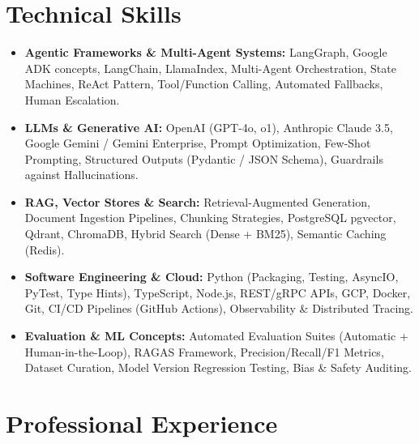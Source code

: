\documentclass[a4paper,10pt]{article}
\begin{document}
\section{Technical Skills}
\begin{itemize}[leftmargin=1.2em, itemsep=2pt]
  \item \textbf{Agentic Frameworks \& Multi-Agent Systems:} LangGraph, Google ADK concepts, LangChain, LlamaIndex, Multi-Agent Orchestration, State Machines, ReAct Pattern, Tool/Function Calling, Automated Fallbacks, Human Escalation.
  \item \textbf{LLMs \& Generative AI:} OpenAI (GPT-4o, o1), Anthropic Claude 3.5, Google Gemini / Gemini Enterprise, Prompt Optimization, Few-Shot Prompting, Structured Outputs (Pydantic / JSON Schema), Guardrails against Hallucinations.
  \item \textbf{RAG, Vector Stores \& Search:} Retrieval-Augmented Generation, Document Ingestion Pipelines, Chunking Strategies, PostgreSQL pgvector, Qdrant, ChromaDB, Hybrid Search (Dense + BM25), Semantic Caching (Redis).
  \item \textbf{Software Engineering \& Cloud:} Python (Packaging, Testing, AsyncIO, PyTest, Type Hints), TypeScript, Node.js, REST/gRPC APIs, GCP, Docker, Git, CI/CD Pipelines (GitHub Actions), Observability \& Distributed Tracing.
  \item \textbf{Evaluation \& ML Concepts:} Automated Evaluation Suites (Automatic + Human-in-the-Loop), RAGAS Framework, Precision/Recall/F1 Metrics, Dataset Curation, Model Version Regression Testing, Bias \& Safety Auditing.
\end{itemize}

\section{Professional Experience}
\end{document}
